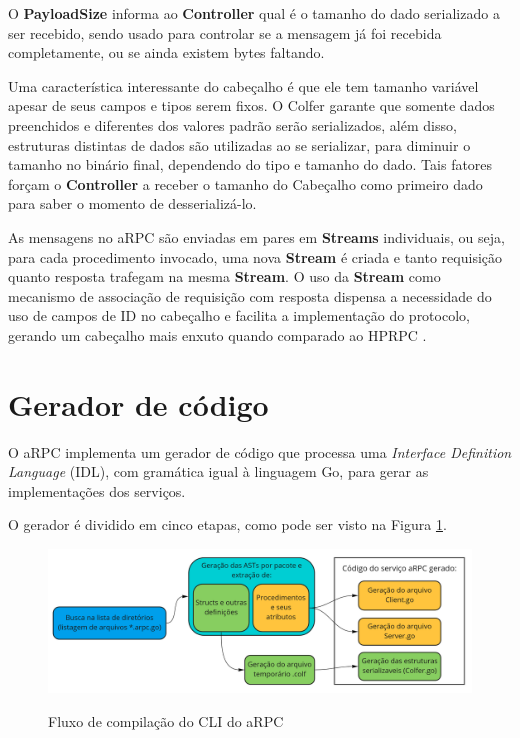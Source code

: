 O \textbf{PayloadSize} informa ao \textbf{Controller} qual é o tamanho do dado serializado a ser recebido, sendo usado para controlar se a mensagem já foi recebida completamente, ou se ainda existem bytes faltando.

Uma característica interessante do cabeçalho é que ele tem tamanho variável apesar de seus campos e tipos serem fixos. O Colfer garante que somente dados preenchidos e diferentes dos valores padrão serão serializados, além disso, estruturas distintas de dados são utilizadas ao se serializar, para diminuir o tamanho no binário final, dependendo do tipo e tamanho do dado. Tais fatores forçam o \textbf{Controller} a receber o tamanho do Cabeçalho como primeiro dado para saber o momento de desserializá-lo.

As mensagens no aRPC são enviadas em pares em \textbf{Streams} individuais, ou seja, para cada procedimento invocado, uma nova \textbf{Stream} é criada e tanto requisição quanto resposta trafegam na mesma \textbf{Stream}. O uso da \textbf{Stream} como mecanismo de associação de requisição com resposta dispensa a necessidade do uso de campos de ID no cabeçalho e facilita a implementação do protocolo, gerando um cabeçalho mais enxuto quando comparado ao HPRPC \cite{bagci_lightweight_2016}.

\section{Gerador de código}

O aRPC implementa um gerador de código que processa uma \textit{Interface Definition Language} (IDL), com gramática igual à linguagem Go, para gerar as implementações dos serviços.

O gerador é dividido em cinco etapas, como pode ser visto na Figura \ref{fig:arpc_compiler_pipeline}. 

\begin{figure}[ht]
    \centering
    \caption{Fluxo de compilação do CLI do aRPC}
    \includegraphics[width=\textwidth]{figuras/diagramas/cap3/arpc_compilador.png} 
    \label{fig:arpc_compiler_pipeline}
\end{figure}

